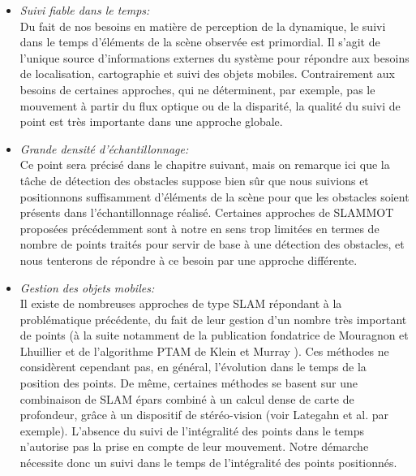 \begin{itemize}
	\item {\emph{Suivi fiable dans le temps:\\}}
	Du fait de nos besoins en matière de perception de la dynamique, le suivi dans le temps d'éléments de la scène observée est primordial. Il s'agit de l'unique source d'informations externes du système pour répondre aux besoins de localisation, cartographie et suivi des objets mobiles. Contrairement aux besoins de certaines approches, qui ne déterminent, par exemple, pas le mouvement à partir du flux optique ou de la disparité, la qualité du suivi de point est très importante dans une approche globale.\\
	
	\item{\emph{Grande densité d'échantillonnage:\\}}
	Ce point sera précisé dans le chapitre suivant, mais on remarque ici que la tâche de détection des obstacles suppose bien sûr que nous suivions et positionnons suffisamment d'éléments de la scène pour que les obstacles soient présents dans l'échantillonnage réalisé. Certaines approches de SLAMMOT proposées précédemment sont à notre en sens trop limitées en termes de nombre de points traités pour servir de base à une détection des obstacles, et nous tenterons de répondre à ce besoin par une approche différente.\\
	
	\item {\emph{Gestion des objets mobiles:\\}}
	Il existe de nombreuses approches de type SLAM répondant à la problématique précédente, du fait de leur gestion d'un nombre très important de points (à la suite notamment de la publication fondatrice de Mouragnon et Lhuillier \cite{Mouragnon2006} et de l'algorithme PTAM de Klein et Murray \cite{Klein2007}). Ces méthodes ne considèrent cependant pas, en général, l'évolution dans le temps de la position des points. De même, certaines méthodes se basent sur une combinaison de SLAM épars combiné à un calcul dense de carte de profondeur, grâce à un dispositif de stéréo-vision (voir Lategahn et al. \cite{Lategahn2011} par exemple). L'absence du suivi de l'intégralité des points dans le temps n'autorise pas la prise en compte de leur mouvement. Notre démarche nécessite donc un suivi dans le temps de l'intégralité des points positionnés.\\
	

\end{itemize}
